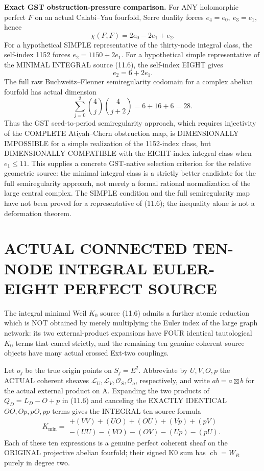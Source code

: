 \documentclass[11pt,a4paper]{article}
\newcommand{\ch}{\operatorname{ch}}
\begin{document}
\noindent\textbf{Exact GST obstruction-pressure comparison.}
For ANY
holomorphic
perfect \(F\)
on an
actual Calabi--Yau
fourfold,
Serre duality
forces
\(
 e_4=e_0,\ e_3=e_1
\),
hence
\[
        \chi(F,F)
           =2e_0-2e_1+e_2 .
\]
For a hypothetical
SIMPLE
representative
of the
thirty-node
integral class,
the self-index
1152 forces
\(
 e_2=1150+2e_1
\).
For a
hypothetical
simple
representative
of the
MINIMAL
INTEGRAL source
(11.6),
the self-index
EIGHT gives
\[
 \boxed{e_2=6+2e_1.}                               \tag{11.11}
\]
The full raw
Buchweitz--Flenner
semiregularity
codomain for
a complex
abelian fourfold
has actual
dimension
\[
 \sum_{j=0}^2
       \binom4j\binom4{j+2}
      =6+16+6=28.
                                                               \tag{11.12}
\]
Thus the
GST seed-to-period
semiregularity
approach, which
requires
injectivity of
the COMPLETE
Atiyah--Chern
obstruction map,
is DIMENSIONALLY
IMPOSSIBLE
for a simple
realization
of the
1152-index
class, but
DIMENSIONALLY
COMPATIBLE
with the
EIGHT-index
integral class
when \(e_1\le11\).
This supplies
a concrete
GST-native
selection
criterion
for the
relative
geometric
source:
the minimal
integral
class is
a strictly
better
candidate
for the
full
semiregularity
approach,
not merely
a formal
rational
normalization
of the
large
central
complex.
The SIMPLE
condition and
the full
semiregularity
map
have not
been
proved
for a
representative
of (11.6);
the inequality
alone is
not a
deformation
theorem.

\section{ACTUAL CONNECTED TEN-NODE INTEGRAL EULER-EIGHT PERFECT SOURCE}
The integral
minimal Weil
\(K_0\) source
(11.6) admits
a further
atomic reduction
which is NOT
obtained by
merely multiplying
the Euler index
of the large
graph network:
its two
external-product
expansions have
FOUR identical
tautological
\(K_0\) terms
that cancel
strictly, and
the remaining
ten genuine
coherent source
objects have
many actual
crossed Ext-two
couplings.

Let \(o_j\)
be the true
origin points
on \(S_j=E^2\).
Abbreviate
by \(U,V,O,p\)
the ACTUAL
coherent sheaves
\(\mathcal L_U,
\mathcal L_V,
\mathcal O_S,
\mathcal O_o\),
respectively,
and write
\(a b=a\boxtimes b\)
for the actual
external product
on A.
Expanding the
two products
of
\(
Q_D=L_D-O+p
\)
in (11.6)
and canceling
the EXACTLY
IDENTICAL
\(OO,Op,pO,pp\)
terms gives
the INTEGRAL
ten-source formula
\[
 \boxed{
 K_{\min}=
 \begin{matrix}
 +(VV)+(UO)+(OU)+(Vp)+(pV)\\
 -(UU)-(VO)-(OV)-(Up)-(pU).
 \end{matrix}}                                         \tag{12.1}
\]
Each of these
ten expressions
is a genuine
perfect
coherent sheaf
on the ORIGINAL
projective abelian
fourfold; their
signed K0 sum
has \(\ch=W_R\)
purely in degree two.
\end{document}
